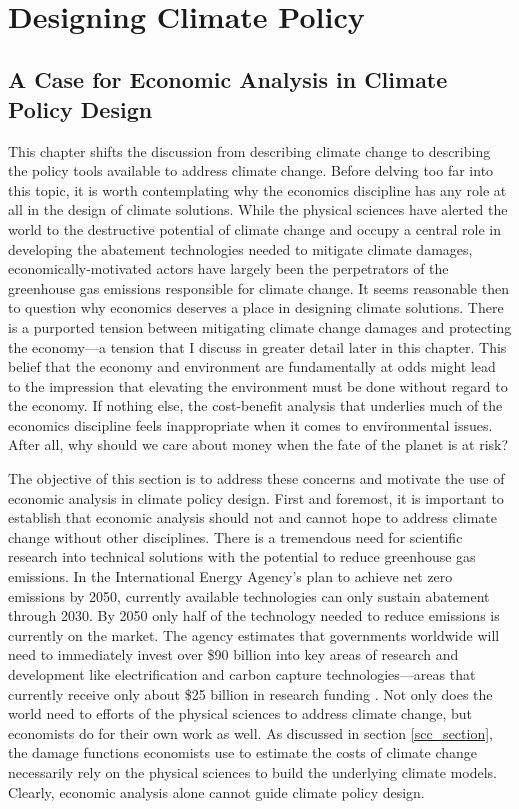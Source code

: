 ~

\newpage
\section{Designing Climate Policy}

\subsection{A Case for Economic Analysis in Climate Policy Design}

This chapter shifts the discussion from describing climate change to describing the policy tools available to address climate change. Before delving too far into this topic, it is worth contemplating why the economics discipline has any role at all in the design of climate solutions. While the physical sciences have alerted the world to the destructive potential of climate change and occupy a central role in developing the abatement technologies needed to mitigate climate damages, economically-motivated actors have largely been the perpetrators of the greenhouse gas emissions responsible for climate change. It seems reasonable then to question why economics deserves a place in designing climate solutions. There is a purported tension between mitigating climate change damages and protecting the economy---a tension that I discuss in greater detail later in this chapter. This belief that the economy and environment are fundamentally at odds might lead to the impression that elevating the environment must be done without regard to the economy. If nothing else, the cost-benefit analysis that underlies much of the economics discipline feels inappropriate when it comes to environmental issues. After all, why should we care about money when the fate of the planet is at risk?

The objective of this section is to address these concerns and motivate the use of economic analysis in climate policy design. First and foremost, it is important to establish that economic analysis should not and cannot hope to address climate change without other disciplines. There is a tremendous need for scientific research into technical solutions with the potential to reduce greenhouse gas emissions. In the International Energy Agency's plan to achieve net zero emissions by 2050, currently available technologies can only sustain abatement through 2030. By 2050 only half of the technology needed to reduce emissions is currently on the market. The agency estimates that governments worldwide will need to immediately invest over \$90 billion into key areas of research and development like electrification and carbon capture technologies---areas that currently receive only about \$25 billion in research funding \citep{ieareport}. Not only does the world need to efforts of the physical sciences to address climate change, but economists do for their own work as well. As discussed in section \ref{scc_section}, the damage functions economists use to estimate the costs of climate change necessarily rely on the physical sciences to build the underlying climate models. Clearly, economic analysis alone cannot guide climate policy design. 

